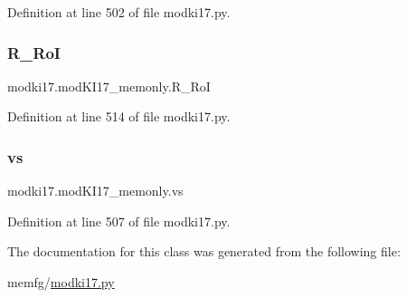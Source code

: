 Definition at line 502 of file modki17.\+py.

\mbox{\label{classmodki17_1_1modKI17__memonly_ae38f2f8fc61b3c67e115804eae04a1dc}} 
\subsubsection{\texorpdfstring{R\+\_\+\+RoI}{R\_RoI}}
{\footnotesize\ttfamily modki17.\+mod\+K\+I17\+\_\+memonly.\+R\+\_\+\+RoI}



Definition at line 514 of file modki17.\+py.

\mbox{\label{classmodki17_1_1modKI17__memonly_a20e35678f46a3680074c9825fbee1827}} 
\subsubsection{\texorpdfstring{vs}{vs}}
{\footnotesize\ttfamily modki17.\+mod\+K\+I17\+\_\+memonly.\+vs}



Definition at line 507 of file modki17.\+py.



The documentation for this class was generated from the following file\+:\begin{DoxyCompactItemize}
\item 
memfg/\hyperlink{modki17_8py}{modki17.\+py}\end{DoxyCompactItemize}
